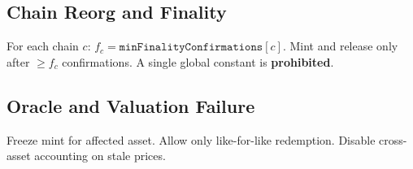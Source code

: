 \subsection{Chain Reorg and Finality}
\label{sec:finality}

\begin{requirement}
For each chain $c$: $f_c = \texttt{minFinalityConfirmations}[c]$. Mint and release only after $\geq f_c$ confirmations. A single global constant is \textbf{prohibited}.
\end{requirement}

\subsection{Oracle and Valuation Failure}

\begin{requirement}
Freeze mint for affected asset. Allow only like-for-like redemption. Disable cross-asset accounting on stale prices.
\end{requirement}


